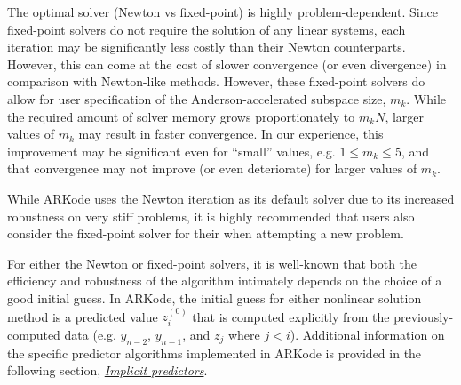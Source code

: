 \documentclass[letterpaper,10pt,english]{sphinxmanual}
\begin{document}
The optimal solver (Newton vs fixed-point) is highly
problem-dependent.  Since fixed-point solvers do not require
the solution of any linear systems, each iteration may be
significantly less costly than their Newton counterparts.  However,
this can come at the cost of slower convergence (or even divergence)
in comparison with Newton-like methods.  However, these fixed-point
solvers do allow for user specification of the Anderson-accelerated
subspace size, $m_k$.  While the required amount of solver
memory grows proportionately to $m_k N$, larger values of
$m_k$ may result in faster convergence.  In our experience, this
improvement may be significant even for ``small'' values,
e.g. $1\le m_k\le 5$, and that convergence may not improve (or
even deteriorate) for larger values of $m_k$.

While ARKode uses the Newton iteration as its default solver due to
its increased robustness on very stiff problems, it is highly
recommended that users also consider the fixed-point solver for their
when attempting a new problem.

For either the Newton or fixed-point solvers, it is well-known that
both the efficiency and robustness of the algorithm intimately depends
on the choice of a good initial guess.  In ARKode, the initial guess
for either nonlinear solution method is a predicted value
$z_i^{(0)}$ that is computed explicitly from the
previously-computed data (e.g. $y_{n-2}$, $y_{n-1}$, and
$z_j$ where $j<i$).  Additional information on the
specific predictor algorithms implemented in ARKode is provided in the
following section, {\hyperref[Mathematics:mathematics-predictors]{\emph{Implicit predictors}}}.
\end{document}
